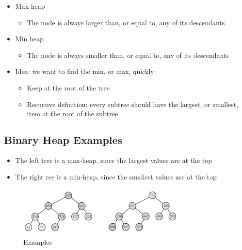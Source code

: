 \documentclass[
  10pt,
  english,
  letterpaper,
,tablecaptionabove
]{scrartcl}
\providecommand{\tightlist}{%
  \setlength{\itemsep}{0pt}\setlength{\parskip}{0pt}}
\begin{document}
\begin{itemize}
\tightlist
\item
  Max heap

  \begin{itemize}
  \tightlist
  \item
    The node is always larger than, or equal to, any of its descendants
  \end{itemize}
\item
  Min heap

  \begin{itemize}
  \tightlist
  \item
    The node is always smaller than, or equal to, any of its descendants
  \end{itemize}
\item
  Idea: we want to find the min, or max, quickly

  \begin{itemize}
  \tightlist
  \item
    Keep at the root of the tree
  \item
    Recursive definition: every subtree should have the largest, or
    smallest, item at the root of the subtree
  \end{itemize}
\end{itemize}

\hypertarget{binary-heap-examples}{%
\subsection{Binary Heap Examples}\label{binary-heap-examples}}

\begin{itemize}
\tightlist
\item
  The left tree is a max-heap, since the largest values are at the top
\item
  The right ree is a min-heap, since the smallest values are at the top
\end{itemize}

\begin{figure}
\centering
\includegraphics[width=0.75\textwidth,height=\textheight]{images/4.png}
\caption{Examples}
\end{figure}
\end{document}
